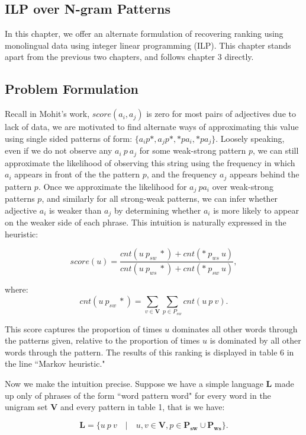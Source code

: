 \subsection{ILP over N-gram Patterns}

In this chapter, we offer an alternate formulation of recovering ranking using monolingual data using integer linear programming (ILP). This chapter stands apart from the previous two chapters, and follows chapter 3 directly. 

\subsection{Problem Formulation}

Recall in Mohit's work, $score(a_i, a_j)$ is zero for most pairs of adjectives due to lack of data, we are motivated to find alternate ways of approximating this value using single sided patterns of form: $\{a_i p *, a_j p *, * p a_i, * p a_j\}$. Loosely speaking, even if we do not observe any $a_i \: p \: a_j$ for some weak-strong pattern $p$, we can still approximate the likelihood of observing this string using the frequency in which $a_i$ appears in front of the the pattern $p$, and the frequency $a_j$ appears behind the pattern $p$. Once we approximate the likelihood for $a_j \: p a_i$ over weak-strong patterns $p$, and similarly for all strong-weak patterns, we can infer whether adjective $a_i$ is weaker than $a_j$ by determining whether $a_i$ is more likely to appear on the weaker side of each phrase. This intuition is naturally expressed in the heuristic:

\[
  score(u) = \frac{ cnt(u \: p_{sw} \: *) + cnt(* \: p_{ws} \: u)  }
                  { cnt(u \: p_{ws} \: *) + cnt(* \: p_{sw} \: u) },
\]

where:
\[cnt( u \: p_{sw} \: *) = \sum_{v \in \mathbf{V}} \sum_{p \in P_{sw}} cnt( u \: p \: v).\]

This score captures the proportion of times $u$ dominates all other words through the patterns given, relative to the proportion of times $u$ is dominated by all other words through the pattern. The results of this ranking is displayed in table 6 in the line ``Markov heuristic."

Now we make the intuition precise. Suppose we have a simple language $\mathbf{L}$ made up only of phrases of the form ``word pattern word" for every word in the unigram set $\mathbf{V}$ and every pattern in table 1, that is we have:

\[ \mathbf{L} = \{ u \: p \: v \quad|\quad u,v \in \mathbf{V}, p \in \mathbf{P_{sw}} \cup \mathbf{P_{ws}} \}. \]


